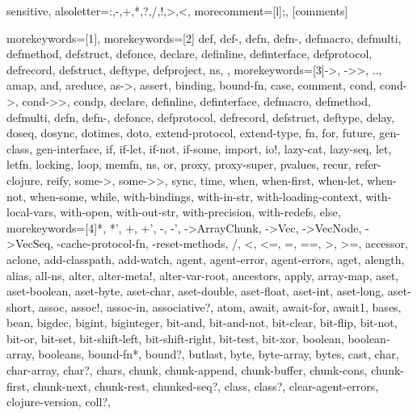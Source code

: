 \usepackage{listings}
\usepackage{color}
\usepackage{xcolor}

{sensitive, %
 alsoletter={:,-,+,*,?,/,!,>,<}, %
 morecomment=[l]{;}, %
}[comments]

%
{%
 morekeywords=[1]{},
 morekeywords=[2]{%
   def, def-, defn, defn-, defmacro, defmulti, defmethod, %
   defstruct, defonce, declare, definline, definterface, %
   defprotocol, defrecord, defstruct, deftype, defproject, ns, %
 }, %
 morekeywords=[3]{->, ->>, .., amap, and, areduce, as->, assert, binding, %
   bound-fn, case, comment, cond, cond->, cond->>, condp, declare, definline, %
   definterface, defmacro, defmethod, defmulti, defn, defn-, defonce, %
   defprotocol, defrecord, defstruct, deftype, delay, doseq, dosync, dotimes, %
   doto, extend-protocol, extend-type, fn, for, future, gen-class, %
   gen-interface, if, if-let, if-not, if-some, import, io!, lazy-cat, lazy-seq, let, %
   letfn, locking, loop, memfn, ns, or, proxy, proxy-super, pvalues, %
   recur, refer-clojure, reify, some->, some->>, sync, time, when, when-first, %
   when-let, when-not, when-some, while, with-bindings, with-in-str, %
   with-loading-context, with-local-vars, with-open, with-out-str, %
   with-precision, with-redefs, else}, %
  morekeywords=[4]{*, *', +, +', -, -', ->ArrayChunk, ->Vec, ->VecNode, %
    ->VecSeq, -cache-protocol-fn, -reset-methods, /, <, <=, =, ==, >, >=, %
    accessor, aclone, add-classpath, add-watch, agent, agent-error, %
    agent-errors, aget, alength, alias, all-ns, alter, alter-meta!, %
    alter-var-root, ancestors, apply, array-map, aset, aset-boolean, aset-byte, %
    aset-char, aset-double, aset-float, aset-int, aset-long, aset-short, assoc, %
    assoc!, assoc-in, associative?, atom, await, await-for, await1, bases, bean, %
    bigdec, bigint, biginteger, bit-and, bit-and-not, bit-clear, bit-flip, %
    bit-not, bit-or, bit-set, bit-shift-left, bit-shift-right, bit-test, %
    bit-xor, boolean, boolean-array, booleans, bound-fn*, bound?, butlast, byte, %
    byte-array, bytes, cast, char, char-array, char?, chars, chunk, %
    chunk-append, chunk-buffer, chunk-cons, chunk-first, chunk-next, chunk-rest, %
    chunked-seq?, class, class?, clear-agent-errors, clojure-version, coll?, %
}}
